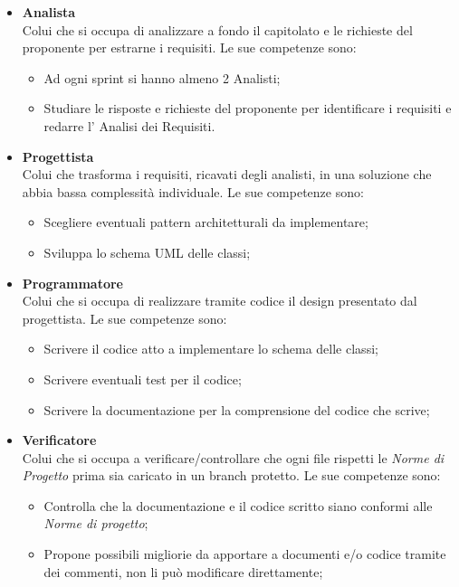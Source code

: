 \begin{itemize}
                    \item \textbf{Analista}\\
                    Colui che si occupa di analizzare a fondo il capitolato e le richieste del proponente per estrarne i requisiti.
                    Le sue competenze sono:
                    \begin{itemize}
                        \item Ad ogni sprint si hanno almeno 2 Analisti;
                        \item Studiare le risposte e richieste del proponente per identificare i requisiti e redarre l' Analisi dei Requisiti.
                    \end{itemize}
                    \item \textbf{Progettista}\\
                    Colui che trasforma i requisiti, ricavati degli analisti, in una soluzione che abbia bassa complessità individuale.
                    Le sue competenze sono:
                    \begin{itemize}
                        \item Scegliere eventuali pattern architetturali da implementare;
                        \item Sviluppa lo schema UML delle classi;
                    \end{itemize}
                    \item \textbf{Programmatore}\\
                    Colui che si occupa di realizzare tramite codice il design presentato dal progettista.
                    Le sue competenze sono:
                    \begin{itemize}
                        \item Scrivere il codice atto a implementare lo schema delle classi;
                        \item Scrivere eventuali test per il codice;
                        \item Scrivere la documentazione per la comprensione del codice che scrive;
                    \end{itemize}
                    \item \textbf{Verificatore}\\
                    Colui che si occupa a verificare/controllare che ogni file rispetti le \textit{Norme di Progetto} prima sia caricato in un branch protetto.
                    Le sue competenze sono:
                    \begin{itemize}
                        \item Controlla che la documentazione e il codice scritto siano conformi alle \textit{Norme di progetto};
                        \item Propone possibili migliorie da apportare a documenti e/o codice tramite dei commenti, non li può modificare direttamente;
                    \end{itemize}
            \end{itemize}

